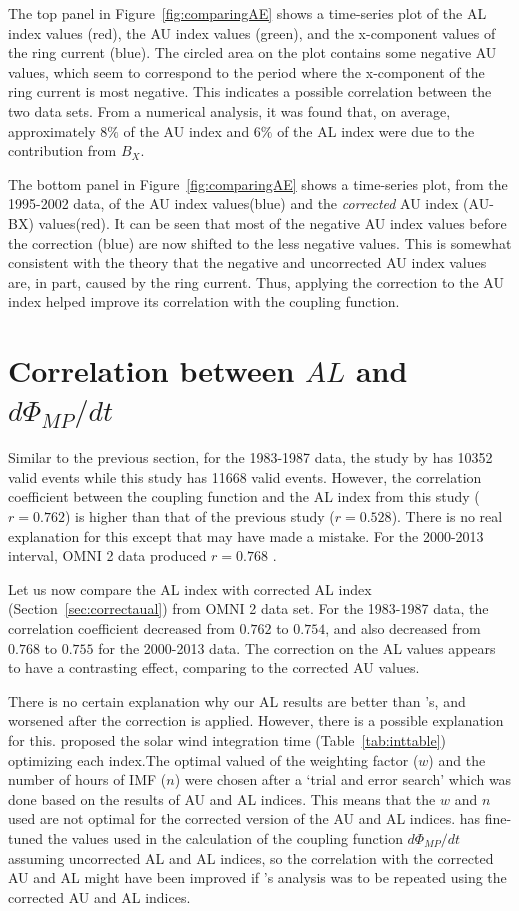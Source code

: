 \documentclass[12pt]{report} %
\begin{document}
The top panel in  Figure~\ref{fig:comparingAE} shows a time-series plot of the AL index values (red), the AU index values (green), and the x-component values of the ring current (blue). The circled area on the plot contains some negative  AU values, which seem to correspond to the period where the x-component of the ring current is most negative. This indicates a possible correlation between the two data sets. From a numerical analysis, it was found that, on average, approximately $8\%$ of the AU index and $6\%$ of the AL index were due to the contribution from $B_X$.

The bottom panel in Figure~\ref{fig:comparingAE} shows a time-series plot, from the 1995-2002 data, of the AU index values(blue) and the \emph{corrected} AU index (AU-BX) values(red). It can be seen that most of the negative AU index values before the correction (blue) are now shifted to the less negative values. This is somewhat consistent with the theory that the negative and uncorrected AU index values are, in part, caused by the ring current. Thus, applying the correction to the AU index helped improve its correlation with the coupling function.

\vspace{-11pt}
\section{Correlation between $AL$ and $d\Phi_{MP}/dt$}
\vspace{-7pt}
Similar to the previous section, for the 1983-1987 data, the study by \cite{newell07} has 10352 valid events while this study has 11668 valid events. However, the correlation coefficient between the coupling function and the AL index from this study ($r=0.762$) is higher than that of the previous study ($r=0.528$). There is no real explanation for this except that \cite{newell07} may have made a mistake. For the 2000-2013 interval, OMNI 2 data produced $r=0.768$ .

Let us now compare the AL index with corrected AL index (Section~\ref{sec:correctaual}) from OMNI 2 data set. For the 1983-1987 data, the correlation coefficient decreased from $0.762$ to $0.754$, and also decreased from $0.768$ to $0.755$ for the 2000-2013 data. The correction on the AL values appears to have a contrasting effect, comparing to the corrected AU values.

There is no certain explanation why our AL results are better than \cite{newell07}'s, and worsened after the correction is applied. However, there is a possible explanation for this. \cite{newell07} proposed the solar wind integration time (Table~\ref{tab:inttable}) optimizing each index.The optimal valued of the weighting factor ($w$) and the number of hours of IMF ($n$) were chosen after a `trial and error search' which was done based on the results of AU and AL indices. This means that the $w$ and $n$ used are not optimal for the corrected version of the AU and AL indices. \cite{newell07} has fine-tuned the values used in the calculation of the coupling function $d\Phi_{MP}/dt$ assuming uncorrected AL and AL indices, so the correlation with the corrected AU and AL might have been improved if \cite{newell07}'s analysis was to be repeated using the corrected AU and AL indices.
\end{document}

